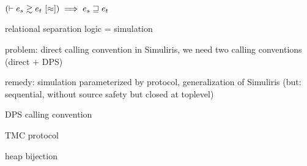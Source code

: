 \begin{theorem}[Adequacy]
    $
        \left( \vdash \iSimv{\iSimilar}{e_s}{e_t} \right) \implies
        e_s \refined e_t
    $
\end{theorem}

relational separation logic = simulation

problem: direct calling convention in Simuliris, we need two calling conventions (direct + DPS)

remedy: simulation parameterized by protocol, generalization of Simuliris (but: sequential, without source safety but closed at toplevel)



%
%
%
%

DPS calling convention

TMC protocol


heap bijection

